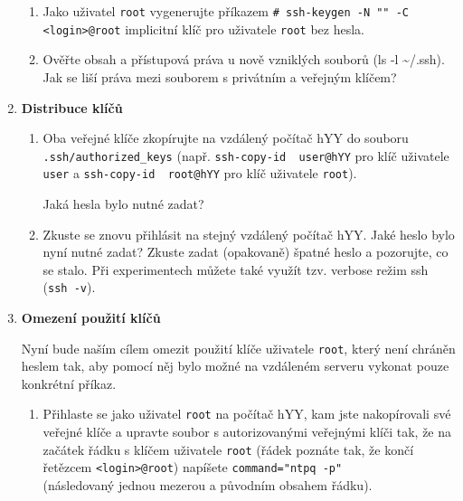 \documentclass[a4paper,11pt]{article}
\begin{document}
\begin{enumerate}
\begin{enumerate}
      \item Jako uživatel {\tt root} vygenerujte příkazem \verb|# ssh-keygen -N "" -C <login>@root|
        implicitní klíč pro uživatele {\tt root} bez hesla.

      \item Ověřte obsah a přístupová práva u nově vzniklých souborů (ls -l \textasciitilde/.ssh). Jak
se liší práva mezi souborem s privátním a veřejným klíčem?

    \end{enumerate}

  \item {\bf Distribuce klíčů}

    \begin{enumerate}

      \item Oba veřejné klíče zkopírujte na vzdálený počítač hYY do
        souboru \verb|.ssh/authorized_keys|
        (např. {\verb&ssh-copy-id  user@hYY&} pro
        klíč uživatele {\tt user}
        a {\verb&ssh-copy-id  root@hYY&} pro
        klíč uživatele {\tt root}).
        
      Jaká hesla bylo nutné zadat?

      \item Zkuste se znovu přihlásit na stejný vzdálený počítač hYY. Jaké heslo bylo nyní nutné zadat? Zkuste
        zadat (opakovaně) špatné heslo a pozorujte, co se stalo. Při experimentech můžete také
využít tzv. verbose režim ssh ({\tt ssh -v}).

    \end{enumerate}

  \item {\bf Omezení použití klíčů}

    Nyní bude naším cílem omezit použití klíče uživatele {\tt root}, který není chráněn heslem tak,
    aby pomocí něj bylo možné na vzdáleném serveru vykonat pouze konkrétní příkaz.

    \begin{enumerate}

      \item Přihlaste se jako uživatel {\tt root} na počítač hYY, kam jste nakopírovali své veřejné klíče a
        upravte soubor s autorizovanými veřejnými klíči tak, že na začátek
        řádku s klíčem uživatele {\tt root} (řádek poznáte tak, že končí řetězcem
        {\tt <login>@root}) napíšete
        \verb|command="ntpq -p" | \\ (následovaný jednou mezerou a původním
        obsahem řádku).


\end{enumerate}
\end{enumerate}
\end{document}
